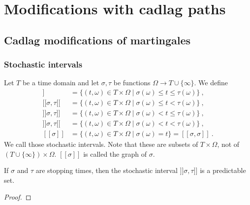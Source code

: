 \chapter{Modifications with cadlag paths}

\section{Cadlag modifications of martingales}

\subsection{Stochastic intervals}


\begin{definition}\label{def:stochasticInterval}
  \leanok
Let $T$ be a time domain and let $\sigma, \tau$ be functions $\Omega \to T \cup \{\infty\}$.
We define
\begin{align*}
  [\![\sigma, \tau]\!]
  &= \{(t, \omega) \in T \times \Omega \mid \sigma(\omega) \le t \le \tau(\omega)\}
  \:, \\
  [\![\sigma, \tau[\![
  &= \{(t, \omega) \in T \times \Omega \mid \sigma(\omega) \le t < \tau(\omega)\}
  \:, \\
  ]\!]\sigma, \tau]\!]
  &= \{(t, \omega) \in T \times \Omega \mid \sigma(\omega) < t \le \tau(\omega)\}
  \:, \\
  ]\!]\sigma, \tau[\![
  &= \{(t, \omega) \in T \times \Omega \mid \sigma(\omega) < t < \tau(\omega)\}
  \:, \\
  [\![\sigma]\!]
  &= \{(t, \omega) \in T \times \Omega \mid \sigma(\omega) = t\} = [\![\sigma, \sigma]\!]
  \:.
\end{align*}
We call those stochastic intervals. Note that these are subsets of $T \times \Omega$, not of $ (T \cup \{\infty\}) \times \Omega$.
$[\![\sigma]\!]$ is called the graph of $\sigma$.
\end{definition}


\begin{lemma}\label{lem:predictable_stochasticInterval}
If $\sigma$ and $\tau$ are stopping times, then the stochastic interval $]\!]\sigma, \tau]\!]$ is a predictable set.
\end{lemma}

\begin{proof}

\end{proof}


